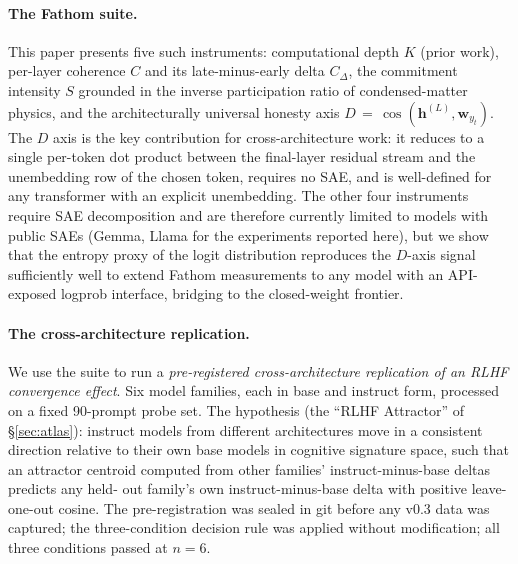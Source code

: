 \documentclass[11pt,letterpaper]{article}
\begin{document}
\paragraph{The Fathom suite.} This paper presents five such instruments:
computational depth $K$ (prior work), per-layer coherence $C$ and its
late-minus-early delta $C_\Delta$, the commitment intensity $S$ grounded in
the inverse participation ratio of condensed-matter physics, and the
architecturally universal honesty axis
$D\,=\,\cos(\mathbf{h}^{(L)},\mathbf{w}_{y_t})$. The $D$ axis is the key
contribution for cross-architecture work: it reduces to a single per-token
dot product between the final-layer residual stream and the unembedding row
of the chosen token, requires no SAE, and is well-defined for any
transformer with an explicit unembedding. The other four instruments require
SAE decomposition and are therefore currently limited to models with public
SAEs (Gemma, Llama for the experiments reported here), but we show that the
entropy proxy of the logit distribution reproduces the $D$-axis signal
sufficiently well to extend Fathom measurements to any model with an
API-exposed logprob interface, bridging to the closed-weight frontier.

\paragraph{The cross-architecture replication.} We use the suite to run a
\emph{pre-registered cross-architecture replication of an RLHF
convergence effect}. Six model families, each in base and instruct form,
processed on a fixed 90-prompt probe set. The hypothesis (the ``RLHF
Attractor'' of \S\ref{sec:atlas}): instruct models from different
architectures move in a consistent direction relative to their own base
models in cognitive signature space, such that an attractor centroid
computed from other families' instruct-minus-base deltas predicts any held-
out family's own instruct-minus-base delta with positive leave-one-out
cosine. The pre-registration was sealed in git before any v0.3 data was
captured; the three-condition decision rule was applied without
modification; all three conditions passed at $n\!=\!6$.
\end{document}
